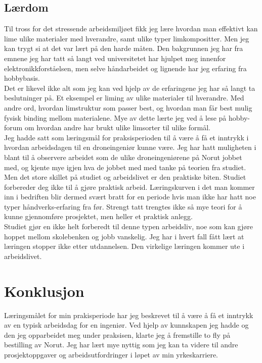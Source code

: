 \documentclass[12pt, a4paper]{article}
\begin{document}
\subsection{Lærdom}
Til tross for det stressende arbeidsmiljøet fikk jeg lære hvordan man effektivt kan lime ulike materialer med hverandre, samt ulike typer limkompositter. Men jeg kan trygt si at det var lært på den harde måten. Den bakgrunnen jeg har fra emnene jeg har tatt så langt ved universitetet har hjulpet meg innenfor elektronikkforståelsen, men selve håndarbeidet og lignende har jeg erfaring fra hobbybasis.\\ Det er likevel ikke alt som jeg kan ved hjelp av de erfaringene jeg har så langt ta beslutninger på. Et eksempel er liming av ulike materialer til hverandre. Med andre ord, hvordan limstruktur som passer best, og hvordan man får best mulig fysisk binding mellom materialene. Mye av dette lærte jeg ved å lese på hobby-forum om hvordan andre har brukt ulike limsorter til ulike formål. \\

Jeg hadde satt som læringsmål for praksisperioden til å være å få et inntrykk i hvordan arbeidsdagen til en droneingeniør kunne være. Jeg har hatt muligheten i blant til å observere arbeidet som de ulike droneingeniørene på Norut jobbet med, og kjente mye igjen hva de jobbet med med tanke på teorien fra studiet. Men det store skillet på studiet og arbeidslivet er den praktiske biten. Studiet forbereder deg ikke til å gjøre praktisk arbeid. Læringskurven i det man kommer inn i bedriften blir dermed svært bratt for en periode hvis man ikke har hatt noe typer håndverks-erfaring fra før. Strengt tatt trengtes ikke så mye teori for å kunne gjennomføre prosjektet, men heller et praktisk anlegg.\\

Studiet gjør en ikke helt forberedt til denne typen arbeidsliv, noe som kan gjøre hoppet mellom skolebenken og jobb vanskelig. Jeg har i hvert fall fått lært at læringen stopper ikke etter utdannelsen. Den virkelige læringen kommer ute i arbeidslivet. \\

\newpage 
\section{Konklusjon}
Læringsmålet for min prakisperiode har jeg beskrevet til å være å få et inntrykk av en typisk arbeidsdag for en ingeniør. Ved hjelp av kunnskapen jeg hadde og den jeg opparbeidet meg under praksisen, klarte jeg å fremstille to fly på bestilling av Norut. Jeg har lært mye nyttig som jeg kan ta videre til andre prosjektoppgaver og arbeidsutfordringer i løpet av min yrkeskarriere. \\
\end{document}
